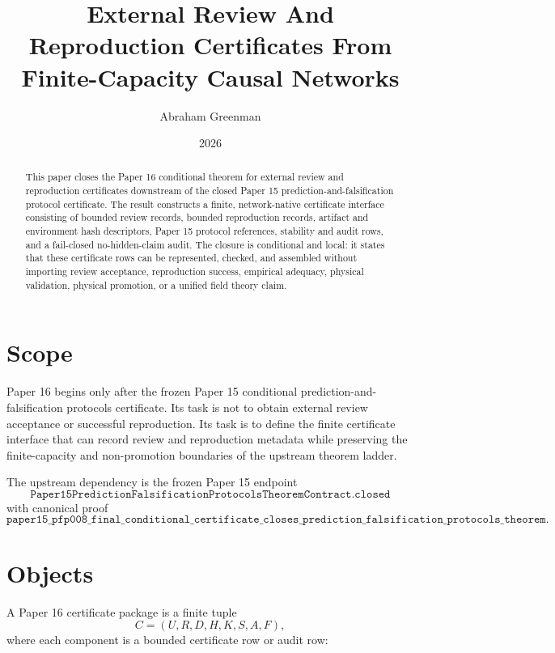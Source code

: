 \documentclass{article}
\title{External Review And Reproduction Certificates From Finite-Capacity Causal Networks}
\author{Abraham Greenman}
\date{2026}
\begin{document}
\maketitle

\begin{abstract}
This paper closes the Paper 16 conditional theorem for external review and
reproduction certificates downstream of the closed Paper 15
prediction-and-falsification protocol certificate. The result constructs a
finite, network-native certificate interface consisting of bounded review
records, bounded reproduction records, artifact and environment hash
descriptors, Paper 15 protocol references, stability and audit rows, and a
fail-closed no-hidden-claim audit. The closure is conditional and local: it
states that these certificate rows can be represented, checked, and assembled
without importing review acceptance, reproduction success, empirical adequacy,
physical validation, physical promotion, or a unified field theory claim.
\end{abstract}

\section{Scope}

Paper 16 begins only after the frozen Paper 15 conditional
prediction-and-falsification protocols certificate. Its task is not to obtain
external review acceptance or successful reproduction. Its task is to define
the finite certificate interface that can record review and reproduction
metadata while preserving the finite-capacity and non-promotion boundaries of
the upstream theorem ladder.

The upstream dependency is the frozen Paper 15 endpoint
\[
\texttt{Paper15PredictionFalsificationProtocolsTheoremContract.closed}
\]
with canonical proof
\[
\texttt{paper15\_pfp008\_final\_conditional\_certificate\_closes\_prediction\_falsification\_protocols\_theorem}.
\]

\section{Objects}

A Paper 16 certificate package is a finite tuple
\[
C=(U,R,D,H,K,S,A,F),
\]
where each component is a bounded certificate row or audit row:
\end{document}
